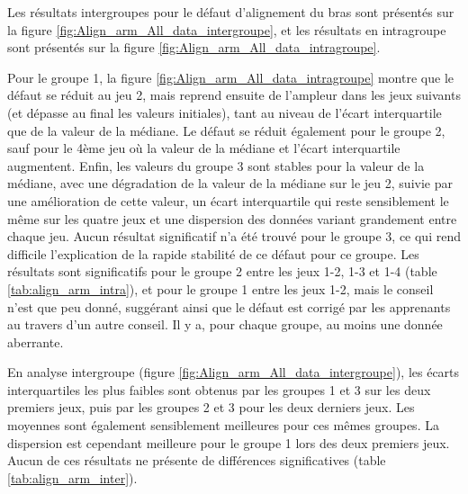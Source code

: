 Les résultats intergroupes pour le défaut d'alignement du bras sont présentés sur la figure \ref{fig:Align_arm_All_data_intergroupe}, et les résultats en intragroupe sont présentés sur la figure \ref{fig:Align_arm_All_data_intragroupe}.

Pour le groupe 1, la figure \ref{fig:Align_arm_All_data_intragroupe} montre que le défaut se réduit au jeu 2, mais reprend ensuite de l'ampleur dans les jeux suivants (et dépasse au final les valeurs initiales), tant au niveau de l'écart interquartile que de la valeur de la médiane. Le défaut se réduit également pour le groupe 2, sauf pour le 4ème jeu où la valeur de la médiane et l'écart interquartile augmentent. Enfin, les valeurs du groupe 3 sont stables pour la valeur de la médiane, avec une dégradation de la valeur de la médiane sur le jeu 2, suivie par une amélioration de cette valeur, un écart interquartile qui reste sensiblement le même sur les quatre jeux et une dispersion des données variant grandement entre chaque jeu. Aucun résultat significatif n'a été trouvé pour le groupe 3, ce qui rend difficile l'explication de la rapide stabilité de ce défaut pour ce groupe. Les résultats sont significatifs pour le groupe 2 entre les jeux 1-2, 1-3 et 1-4 (table \ref{tab:align_arm_intra}), et pour le groupe 1 entre les jeux 1-2, mais le conseil n'est que peu donné, suggérant ainsi que le défaut est corrigé par les apprenants au travers d'un autre conseil. Il y a, pour chaque groupe, au moins une donnée aberrante.


En analyse intergroupe (figure \ref{fig:Align_arm_All_data_intergroupe}), les écarts interquartiles les plus faibles sont obtenus par les groupes 1 et 3 sur les deux premiers jeux, puis par les groupes 2 et 3 pour les deux derniers jeux. Les moyennes sont également sensiblement meilleures pour ces mêmes groupes. La dispersion est cependant meilleure pour le groupe 1 lors des deux premiers jeux. Aucun de ces résultats ne présente de différences significatives (table \ref{tab:align_arm_inter}).

